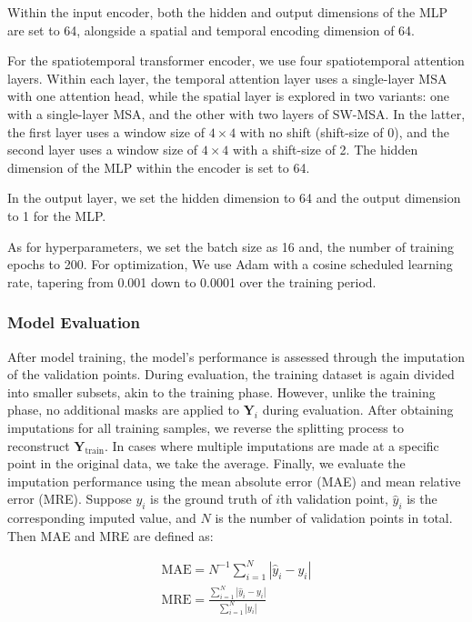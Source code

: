 \documentclass[11pt]{article}
\begin{document}
Within the input encoder, both the hidden and output dimensions of the MLP are set to 64, alongside a spatial and temporal encoding dimension of 64. 

For the spatiotemporal transformer encoder, we use four spatiotemporal attention layers. Within each layer, the temporal attention layer uses a single-layer MSA with one attention head, while the spatial layer is explored in two variants: one with a single-layer MSA, and the other with two layers of SW-MSA. In the latter, the first layer uses a window size of $4\times 4$ with no shift (shift-size of 0), and the second layer uses a window size of $4 \times 4$ with a shift-size of 2. The hidden dimension of the MLP within the encoder is set to 64. 

In the output layer, we set the hidden dimension to 64 and the output dimension to 1 for the MLP. 

As for hyperparameters, we set the batch size as 16 and, the number of training epochs to 200. For optimization, We use Adam \citep{kingma2014adam} with a cosine scheduled learning rate, tapering from 0.001 down to 0.0001 over the training period.


\subsubsection*{Model Evaluation}
After model training, the model's performance is assessed through the imputation of the validation points. During evaluation, the training dataset is again divided into smaller subsets, akin to the training phase. However, unlike the training phase, no additional masks are applied to $\boldsymbol{Y}_i$ during evaluation. After obtaining imputations for all training samples, we reverse the splitting process to reconstruct $\boldsymbol{Y}_{\text{train}}$. In cases where multiple imputations are made at a specific point in the original data, we take the average. Finally, we evaluate the imputation performance using the mean absolute error (MAE) and mean relative error (MRE). Suppose $y_i$ is the ground truth of $i$th validation point, $\hat{y}_i$ is the corresponding imputed value, and $N$ is the number of validation points in total. Then MAE and MRE are defined as:


\begin{align}
		\text{MAE}=N^{-1}\sum_{i=1}^N |\hat{y}_i - y_i|\\
		\text{MRE}=\frac{\sum_{i=1}^N|\hat{y}_i-y_i|}{\sum_{i=1}^N|y_i|}
\end{align}
\end{document}
